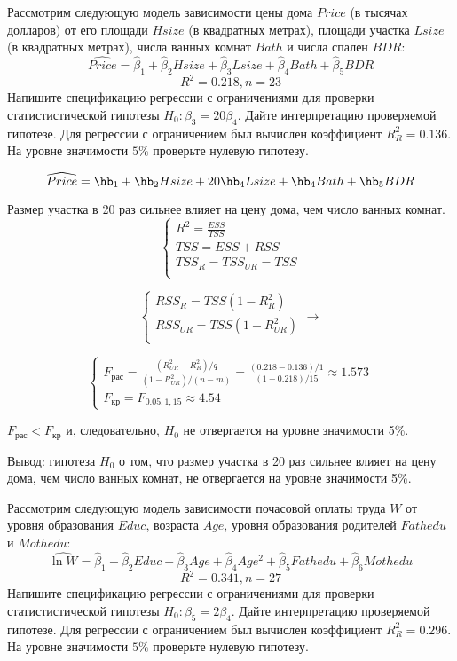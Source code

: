 \documentclass[pdftex,11pt,openany]{book}\usepackage[]{graphicx}\usepackage[]{color}
\begin{document}
\begin{problem}
 Рассмотрим следующую модель зависимости цены дома $Price$ (в тысячах долларов) от его площади $Hsize$ (в квадратных метрах), площади участка $Lsize$ (в квадратных метрах), числа ванных комнат $Bath$ и числа спален $BDR$:
\[
\widehat{Price} = \hat{\beta}_1 + \hat{\beta}_2 Hsize + \hat{\beta}_3 Lsize + \hat{\beta}_4 Bath + \hat{\beta}_5 BDR
\]
\[
R^2 = 0.218, n = 23
\]
Напишите спецификацию регрессии с ограничениями для проверки статистистической гипотезы $H_0: \beta_3 = 20\beta_4$. Дайте интерпретацию проверяемой гипотезе. Для регрессии с ограничением был вычислен коэффициент $R_{R}^2 = 0.136$. На уровне значимости $5\%$ проверьте нулевую гипотезу.
\end{problem}

\begin{solution}
\[
\widehat{Price}= \hb_1+\hb_2 Hsize+20\hb_4 Lsize+\hb_4 Bath + \hb_5 BDR
\]

Размер участка в 20 раз сильнее влияет на цену дома, чем число ванных комнат.
\[
\begin{cases}
R^2=\frac{ESS}{TSS}\\
TSS=ESS+RSS\\
TSS_R=TSS_{UR}=TSS\\
\end{cases}
\]

\[
\begin{cases}
RSS_{R}=TSS(1-R^2_{R})\\
RSS_{UR}=TSS(1-R^2_{UR})\\
\end{cases} \to
\]

\[
\begin{cases}
F_{\text{рас}}=\frac{(R_{UR}^2-R_{R}^2)/q}{(1-R^2_{UR})/(n-m)}=\frac{(0.218-0.136)/1}{(1-0.218)/15}\approx 1.573\\
F_{\text{кр}}= F_{0.05,1,15}\approx 4.54
\end{cases}
\]

$F_{\text{рас}}<F_{\text{кр}}$ и, следовательно, $H_0$ не отвергается на уровне значимости 5\%.

Вывод: гипотеза $H_0$ о том, что размер участка в 20 раз сильнее влияет на цену дома, чем число ванных комнат, не отвергается на уровне значимости 5\%.
\end{solution}


\begin{problem}
 Рассмотрим следующую модель зависимости почасовой оплаты труда $W$ от уровня образования $Educ$, возраста $Age$, уровня образования родителей $Fathedu$ и $Mothedu$:
\[
\widehat{\ln W} = \hat{\beta}_1 + \hat{\beta}_2 Educ + \hat{\beta}_3 Age + \hat{\beta}_4 Age^2+ \hat{\beta}_5 Fathedu + \hat{\beta}_6 Mothedu
\]
\[
R^2 = 0.341, n = 27
\]
Напишите спецификацию регрессии с ограничениями для проверки статистистической гипотезы $H_0: \beta_5 = 2\beta_4$. Дайте интерпретацию проверяемой гипотезе. Для регрессии с ограничением был вычислен коэффициент $R_{R}^2 = 0.296$. На уровне значимости $5\%$ проверьте нулевую гипотезу.
\end{problem}
\end{document}

